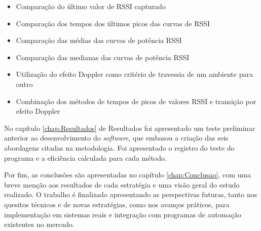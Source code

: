 \begin{itemize}
    \item Comparação do último valor de RSSI capturado
    \item Comparação dos tempos dos últimos picos das curvas de RSSI
    \item Comparação das médias das curvas de potência RSSI
    \item Comparação das medianas das curvas de potência RSSI
    \item Utilização do efeito Doppler como critério de travessia de um ambiente para outro
    \item Combinação dos métodos de tempos de picos de valores RSSI e transição por efeito Doppler
\end{itemize}

No capítulo \ref{chap:Resultados} de Resultados foi apresentado um teste preliminar anterior ao desenvolvimento do \textit{software}, que embasou a criação das seis abordagens citadas na metodologia. Foi apresentado o registro do teste do programa e a eficiência calculada para cada método.

Por fim, as conclusões são apresentadas no capítulo \ref{chap:Conclusao}, com uma breve menção aos resultados de cada estratégia e uma visão geral do estudo realizado. O trabalho é finalizado apresentando as perspectivas futuras, tanto nos quesitos técnicos e de novas estratégias, como nos avanços práticos, para implementação em sistemas reais e integração com programas de automação existentes no mercado.